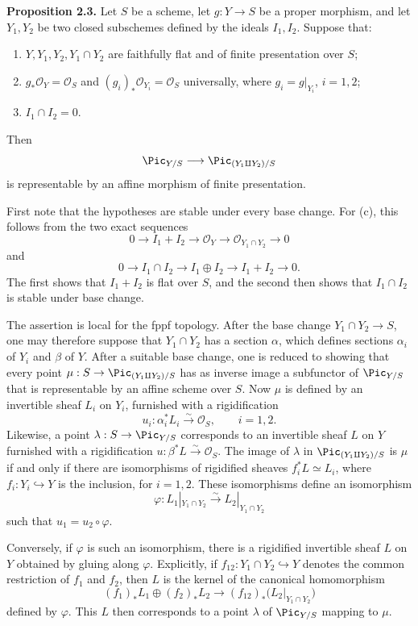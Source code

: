 \textbf{Proposition 2.3.} Let $S$ be a scheme, let $g:Y\to S$ be a proper
morphism, and let $Y_1,Y_2$ be two closed subschemes defined by the ideals
$I_1,I_2$. Suppose that:
\begin{enumerate}[label=\alph*)]
\item $Y,Y_1,Y_2,Y_1\cap Y_2$ are faithfully flat and of finite presentation
  over $S$;
\item $g_*\mathcal O_Y=\mathcal O_S$ and
  $(g_i)_*\mathcal O_{Y_i}=\mathcal O_S$ universally, where
  $g_i=g|_{Y_i}$, $i=1,2$;
\item $I_1\cap I_2=0$.
\end{enumerate}
Then
\[
  \Pic_{Y/S}\longrightarrow\Pic_{(Y_1\amalg Y_2)/S}
\]
is representable by an affine morphism of finite presentation.

First note that the hypotheses are stable under every base change. For (c),
this follows from the two exact sequences
\[
  0\longrightarrow I_1+I_2\longrightarrow\mathcal O_Y
  \longrightarrow\mathcal O_{Y_1\cap Y_2}\longrightarrow0
\]
and
\[
  0\longrightarrow I_1\cap I_2\longrightarrow I_1\oplus I_2
  \longrightarrow I_1+I_2\longrightarrow0.
\]
The first shows that $I_1+I_2$ is flat over $S$, and the second then shows
that $I_1\cap I_2$ is stable under base change.

The assertion is local for the fppf topology. After the base change
$Y_1\cap Y_2\to S$, one may therefore suppose that $Y_1\cap Y_2$ has a
section $\alpha$, which defines sections $\alpha_i$ of $Y_i$ and $\beta$ of
$Y$. After a suitable base change, one is reduced to showing that every point
$\mu:S\to\Pic_{(Y_1\amalg Y_2)/S}$ has as inverse image a subfunctor of
$\Pic_{Y/S}$ that is representable by an affine scheme over $S$. Now $\mu$
is defined by an invertible sheaf $L_i$ on $Y_i$, furnished with a
rigidification
\[
  u_i:\alpha_i^*L_i\xrightarrow{\sim}\mathcal O_S,
  \qquad i=1,2.
\]
Likewise, a point $\lambda:S\to\Pic_{Y/S}$ corresponds to an invertible
sheaf $L$ on $Y$ furnished with a rigidification
$u:\beta^*L\xrightarrow{\sim}\mathcal O_S$. The image of $\lambda$ in
$\Pic_{(Y_1\amalg Y_2)/S}$ is $\mu$ if and only if there are isomorphisms of
rigidified sheaves $f_i^*L\simeq L_i$, where $f_i:Y_i\hookrightarrow Y$ is
the inclusion, for $i=1,2$. These isomorphisms define an isomorphism
\[
  \varphi:L_1|_{Y_1\cap Y_2}\xrightarrow{\sim}
  L_2|_{Y_1\cap Y_2}
\]
such that $u_1=u_2\circ\varphi$.

Conversely, if $\varphi$ is such an isomorphism, there is a rigidified
invertible sheaf $L$ on $Y$ obtained by gluing along $\varphi$. Explicitly,
if $f_{12}:Y_1\cap Y_2\hookrightarrow Y$ denotes the common restriction of
$f_1$ and $f_2$, then $L$ is the kernel of the canonical homomorphism
\[
  (f_1)_*L_1\oplus(f_2)_*L_2
  \longrightarrow
  (f_{12})_*\bigl(L_2|_{Y_1\cap Y_2}\bigr)
\]
defined by $\varphi$. This $L$ then corresponds to a point $\lambda$ of
$\Pic_{Y/S}$ mapping to $\mu$.

